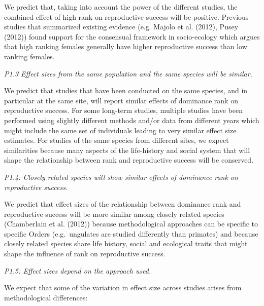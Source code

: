 \documentclass[]{article}
\begin{document}
We predict that, taking into account the power of the different studies,
the combined effect of high rank on reproductive success will be
positive. Previous studies that summarized existing evidence (e.g.
Majolo et al. (2012), Pusey (2012)) found support for the consensual
framework in socio-ecology which argues that high ranking females
generally have higher reproductive success than low ranking females.

\emph{P1.3 Effect sizes from the same population and the same species
will be similar.}

We predict that studies that have been conducted on the same species,
and in particular at the same site, will report similar effects of
dominance rank on reproductive success. For some long-term studies,
multiple studies have been performed using slightly different methods
and/or data from different years which might include the same set of
individuals leading to very similar effect size estimates. For studies
of the same species from different sites, we expect similarities because
many aspects of the life-history and social system that will shape the
relationship between rank and reproductive success will be conserved.

\emph{P1.4: Closely related species will show similar effects of
dominance rank on reproductive success.}

We predict that effect sizes of the relationship between dominance rank
and reproductive success will be more similar among closely related
species (Chamberlain et al. (2012)) because methodological approaches
can be specific to specific Orders (e.g.~ungulates are studied
differently than primates) and because closely related species share
life history, social and ecological traits that might shape the
influence of rank on reproductive success.

\emph{P1.5: Effect sizes depend on the approach used.}

We expect that some of the variation in effect size across studies
arises from methodological differences:
\end{document}
